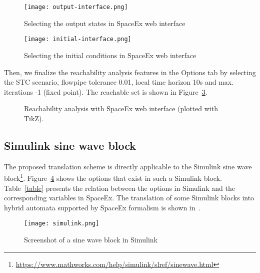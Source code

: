 \documentclass{article}
\begin{document}
\begin{figure}[ht!]
\centering
\texttt{[image: output-interface.png]}
\caption{Selecting the output states in SpaceEx web interface}
\label{out}
\end{figure}
\begin{figure}[ht!]
\centering
\texttt{[image: initial-interface.png]}
\caption{Selecting the initial conditions in SpaceEx web interface}
\label{spec}
\end{figure}
%
Then, we finalize the reachability analysis features in the {\sf Options} tab by selecting the STC scenario, flowpipe tolerance 0.01, local time horizon 10s and max. iterations -1 (fixed point). The reachable set is shown in Figure~\ref{reach}.  
\begin{figure}[ht!]
\centering
{}
\caption{Reachability analysis with SpaceEx web interface (plotted with TikZ).}
\label{reach}
\end{figure}

\subsection{Simulink sine wave block}

The proposed translation scheme is directly applicable to the Simulink sine wave block\footnote{\url{https://www.mathworks.com/help/simulink/slref/sinewave.html}}. Figure~\ref{simulink} shows the options that exist in such a Simulink block. Table~\ref{table} presents the relation between the options in Simulink and the corresponding variables in SpaceEx. The translation of some Simulink blocks into hybrid automata supported by SpaceEx formalism is shown in~\cite{kekatos2017constructing,kekatos2018formal}.

\begin{figure}[ht!]
\centering
\texttt{[image: simulink.png]}
\caption{Screenshot of a sine wave block in Simulink}
\label{simulink}
\end{figure}
%
\end{document}
